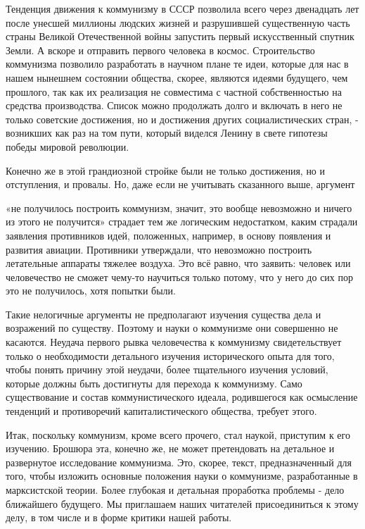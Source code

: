 \documentclass[../main]{subfiles}
\begin{document}
Тенденция движения к коммунизму в СССР позволила всего через двенадцать лет после унесшей миллионы людских жизней и разрушившей существенную часть страны Великой Отечественной войны запустить первый искусственный спутник Земли. А вскоре и отправить первого человека в космос. Строительство коммунизма позволило разработать в научном плане те идеи, которые для нас в нашем нынешнем состоянии общества, скорее, являются идеями будущего, чем прошлого, так как их реализация не совместима с частной собственностью на средства производства. Список можно продолжать долго и включать в него не только советские достижения, но и достижения других социалистических стран, - возникших как раз на том пути, который виделся Ленину в свете гипотезы победы мировой революции.

Конечно же в этой грандиозной стройке были не только достижения, но и отступления, и провалы. Но, даже если не учитывать сказанного выше, аргумент

«не получилось построить коммунизм, значит, это вообще невозможно и ничего из этого не получится» страдает тем же логическим недостатком, каким страдали заявления противников идей, положенных, например, в основу появления и развития авиации. Противники утверждали, что невозможно построить летательные аппараты тяжелее воздуха. Это всё равно, что заявить: человек или человечество не сможет чему-то научиться только потому, что у него до сих пор это не получилось, хотя попытки были.

Такие нелогичные аргументы не предполагают изучения существа дела и возражений по существу. Поэтому и науки о коммунизме они совершенно не касаются. Неудача первого рывка человечества к коммунизму свидетельствует только о необходимости детального изучения исторического опыта для того, чтобы понять причину этой неудачи, более тщательного изучения условий, которые должны быть достигнуты для перехода к коммунизму. Само существование и состав коммунистического идеала, родившегося как осмысление тенденций и противоречий капиталистического общества, требует этого.

Итак, поскольку коммунизм, кроме всего прочего, стал наукой, приступим к его изучению. Брошюра эта, конечно же, не может претендовать на детальное и развернутое исследование коммунизма. Это, скорее, текст, предназначенный для того, чтобы изложить основные положения науки о коммунизме, разработанные в марксистской теории. Более глубокая и детальная проработка проблемы - дело ближайшего будущего. Мы приглашаем наших читателей присоединиться к этому делу, в том числе и в форме критики нашей работы.
\end{document}
